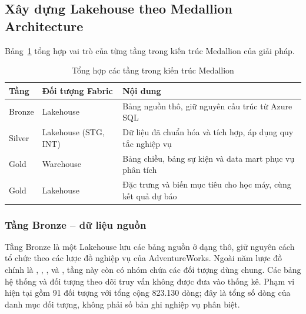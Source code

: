 \subsection{Xây dựng Lakehouse theo Medallion Architecture}

Bảng~\ref{tab:medallion-layers} tổng hợp vai trò của từng tầng trong kiến trúc Medallion của giải pháp.

\begin{table}[H]\centering
\caption{Tổng hợp các tầng trong kiến trúc Medallion}
\label{tab:medallion-layers}
\begin{tabularx}{\textwidth}{|l|l|X|}\hline
\textbf{Tầng} & \textbf{Đối tượng Fabric} & \textbf{Nội dung} \\ \hline
Bronze & Lakehouse & Bảng nguồn thô, giữ nguyên cấu trúc từ Azure SQL \\ \hline
Silver & Lakehouse (STG, INT) & Dữ liệu đã chuẩn hóa và tích hợp, áp dụng quy tắc nghiệp vụ \\ \hline
Gold & Warehouse & Bảng chiều, bảng sự kiện và data mart phục vụ phân tích \\ \hline
Gold & Lakehouse & Đặc trưng và biến mục tiêu cho học máy, cùng kết quả dự báo \\ \hline
\end{tabularx}
\end{table}

\subsubsection{Tầng Bronze – dữ liệu nguồn}

Tầng Bronze là một Lakehouse lưu các bảng nguồn ở dạng thô, giữ nguyên cách tổ chức theo các lược đồ nghiệp vụ của AdventureWorks. Ngoài năm lược đồ chính là , , ,  và , tầng này còn có nhóm  chứa các đối tượng dùng chung. Các bảng hệ thống và đối tượng theo dõi truy vấn không được đưa vào thống kê. Phạm vi hiện tại gồm 91 đối tượng với tổng cộng 823.130 dòng; đây là tổng số dòng của danh mục đối tượng, không phải số bản ghi nghiệp vụ phân biệt.


